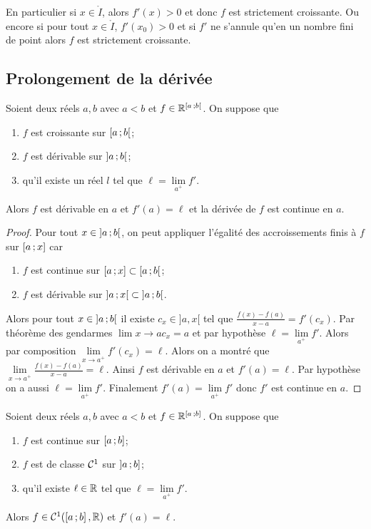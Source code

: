 En particulier si $x \in \mathring{I}$, alors $f'(x)>0$ et donc $f$ est strictement croissante. Ou encore si pour tout $x \in \mathring{I}$,  $f'(x_0) >0$ et si $f'$ ne s'annule qu'en un nombre fini de point alors $f$ est strictement croissante.

\subsection{Prolongement de la dérivée}

\begin{theo}
  Soient deux réels $a,b$ avec $a <b$ et $f \in \mathbb{R}^{\left[ a \, ;  b \right[}$. On suppose que
  \begin{enumerate}
  \item $f$ est croissante sur $\left[ a \, ;  b \right[$;
  \item $f$ est dérivable sur $\left] a \, ;  b \right[$;
  \item qu'il existe un réel $l$ tel que $\ell = \lim\limits_{a^+}f'$.
  \end{enumerate}
  Alors $f$ est dérivable en $a$ et $f'(a)=\ell$ et la dérivée de $f$ est continue en $a$.
\end{theo}
\begin{proof}
  Pour tout $x \in \left] a \, ;  b \right[$, on peut appliquer l'égalité des accroissements finis à $f$ sur $\left[ a \, ;  x \right]$ car
  \begin{enumerate}
  \item $f$ est continue sur $\left[ a \, ;  x \right] \subset \left[ a \, ;  b \right[$;
  \item $f$ est dérivable sur $\left] a \, ;  x \right[ \subset \left] a \, ;  b \right[$.
  \end{enumerate}
  Alors pour tout $x \in  \left] a \, ;  b \right[$ il existe $c_x \in ]a,x[$ tel que $\frac{f(x)-f(a)}{x-a}=f'(c_x)$. Par théorème des gendarmes $\lim\limits{x \to a} c_x=a$ et par hypothèse $\ell = \lim\limits_{a^+}f'$. Alors par composition $\lim\limits_{x \to a^+} f'(c_x)=\ell$. Alors on a montré que $\lim\limits_{x \to a^+} \frac{f(x)-f(a)}{x-a} = \ell$. Ainsi $f$ est dérivable en $a$ et $f'(a)=\ell$. Par hypothèse on a aussi $\ell = \lim\limits_{a^+}f'$. Finalement $f'(a)=\lim\limits_{a^+}f'$ donc $f'$ est continue en $a$.
\end{proof}
\begin{corth}
  Soient deux réels $a,b$ avec $a<b$ et $f\in \mathbb{R}^{\left[ a \, ;  b \right]}$. On suppose que
  \begin{enumerate}
  \item $f$ est continue sur $\left[ a \, ;  b \right]$;
  \item $f$ est de classe $\mathcal{C}^{1}$ sur $\left] a \, ;  b \right]$;
  \item qu'il existe $\ell \in \mathbb{R}$ tel que $\ell=\lim\limits_{a^+}f'$.
  \end{enumerate}
  Alors $f \in \mathcal{C}^{1}(\left[ a \, ;  b \right],\mathbb{R})$ et $f'(a)=\ell$.
\end{corth}


